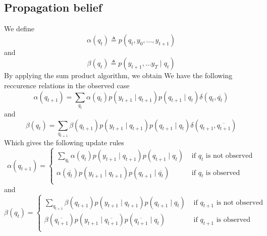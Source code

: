 \documentclass[a4paper, 11pt]{article}
\newcommand{\eqdef}{\triangleq}
\begin{document}
\subsection{Propagation belief}

We define
\begin{displaymath}
  \alpha(q_t) \eqdef p(q_{t}, y_0, \dots, y_{t+1})
\end{displaymath}
and
\begin{displaymath}
  \beta(q_{t}) \eqdef p(y_{t+1}, \dots y_T \mid q_t)
\end{displaymath}
By applying the sum product algorithm, we obtain We have the following
reccurence relations in the observed case
\begin{displaymath}
  \alpha(q_{t + 1}) = \sum_{q_t} \alpha(q_t) p(y_{t+1} \mid q_{t+1}) p(q_{t+1} \mid q_t) \delta(q_t, \overline{q_t})
\end{displaymath}
and
\begin{displaymath}
  \beta(q_{t}) = \sum_{q_{t+1}} \beta(q_{t+1}) p(y_{t+1} \mid q_{t+1}) p(q_{t+1} \mid q_t) \delta(q_{t+1}, \overline{q_{t+1}})
\end{displaymath}
Which gives the following update rules
\begin{displaymath}
  \alpha(q_{t + 1}) = \left\{
    \begin{array}{ll}
      \sum_{q_t} \alpha(q_t) p(y_{t+1} \mid q_{t+1}) p(q_{t+1} \mid q_t)
      & \text{ if $q_t$ is not observed} \\[0.5em]
      \alpha(\overline{q_t}) p(y_{t+1} \mid q_{t+1}) p(q_{t+1} \mid \overline{q_t})
      & \text{ if $q_t$ is observed} \\
    \end{array}
  \right.
\end{displaymath}
  and
\begin{displaymath}
  \beta(q_{t}) = \left\{
    \begin{array}{ll}
      \sum_{q_{t+1}} \beta(q_{t+1}) p(y_{t+1} \mid q_{t+1}) p(q_{t+1} \mid q_t)
      & \text{ if $q_{t+1}$ is not observed} \\[0.5em]
      \beta(\overline{q_{t+1}}) p(y_{t+1} \mid \overline{q_{t+1}}) p(\overline{q_{t+1}} \mid q_t)
      & \text{ if $q_{t+1}$ is observed} \\[0.5em]
    \end{array}
    \right.
\end{displaymath}
\end{document}
